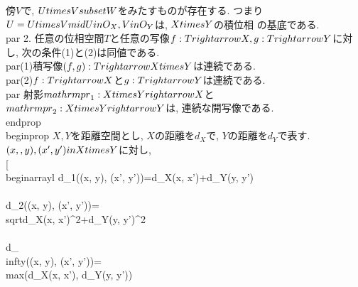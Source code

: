  傍$V$で, $U\\times V\\subset W$をみたすものが存在する. つまり
 $\\U=\\{U\\times V\\mid U\\in \\O_{X}, V\\in \\O_{Y}\\}$は, $X\\times Y$の積位相
 の基底である.
 \\par 2. 任意の位相空間$T$と任意の写像$f:T\\rightarrow X, g:T\\rightarrow
 Y$に対し, 次の条件(1)と(2)は同値である.
 \\par(1)積写像$(f, g):T\\rightarrow X\\times Y$は連続である.
 \\par(2)$f:T\\rightarrow X$と$g:T\\rightarrow Y$は連続である.
 \\par 射影$\\mathrm{pr}_{1}:X\\times Y\\rightarrow X$と
 $\\mathrm{pr}_{2}:X\\times Y\\rightarrow Y$は, 連続な開写像である.
\\end{prop}
\\begin{prop}
 $X, Y$を距離空間とし, $X$の距離を$d_{X}$で, $Y$の距離を$d_{Y}$で表す.
 $(x, , y), (x', y')\\in X\\times Y$に対し,
 \\[
  \\begin{array}{l}
   d_{1}((x, y), (x', y'))=d_{X}(x, x')+d_{Y}(y, y')\\\\
   d_{2}((x, y), (x', y'))=\\sqrt{d_{X}(x, x')^{2}+d_{Y}(y, y')^{2}}\\\\
   d_{\\infty}((x, y), (x', y'))=\\max(d_{X}(x, x'), d_{Y}(y, y'))\\\\
